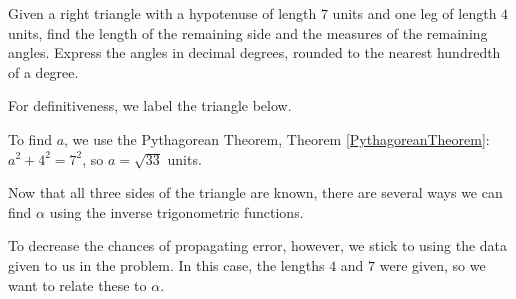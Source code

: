 \documentclass{ximera}
\begin{document}
\begin{example}  \label{righttrianglereviewex}  Given a right triangle with a hypotenuse of length $7$ units and one leg of length $4$ units, find the length of the remaining side and the measures of the remaining angles. Express the angles in decimal degrees, rounded to the nearest hundredth of a degree.

 

\begin{explanation} For definitiveness, we label the triangle below. 

\begin{image}
\end{image}

To find $a$, we use the Pythagorean Theorem, Theorem \ref{PythagoreanTheorem}: $a^2 + 4^2 = 7^2$, so $a = \sqrt{33}$ units. 

 

Now that all three sides of the triangle are known, there are several ways we can find $\alpha$ using the inverse trigonometric functions.  

 

To decrease the chances of propagating error, however, we stick to using the data given to us in the problem.  In this case, the lengths $4$ and $7$ were given, so we want to relate these to $\alpha$. 


\end{explanation}
\end{example}
\end{document}
